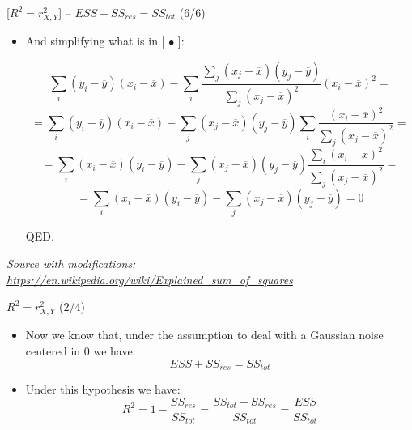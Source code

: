 \documentclass{beamer}
\begin{document}
\begin{frame}
{\centerline{ [$R^2 = r_{X,Y}^2$] -- $ESS + SS_{res} = SS_{tot} $ (6/6)}}

\begin{itemize}
\item And simplifying what is in [ $\bullet$ ]:

$$ \sum_i (y_{i}-{\overline {y}}) (x_i - \overline{x}) -
\sum_i{{\frac {\sum _{j}(x_{j}-{\overline {x}})(y_{j}-{\overline {y}})}{\sum _{j}(x_{j}-{\overline {x}})^{2}}}
}(x_{i}-{\overline {x}})^2 = $$
$$=  \sum_i (y_{i}-{\overline {y}}) (x_i - \overline{x}) -
\sum _{j}(x_{j}-{\overline {x}})(y_{j}-{\overline {y}})\sum_i{{\frac {(x_{i}-{\overline {x}})^2}{\sum _{j}(x_{j}-{\overline {x}})^{2}}}
}= $$
$$=  \sum_i (x_i - \overline{x}) (y_{i}-{\overline {y}})  -
\sum _{j}(x_{j}-{\overline {x}})(y_{j}-{\overline {y}}){\frac {\sum_i{(x_{i}-{\overline {x}})^2}}{\sum _{j}(x_{j}-{\overline {x}})^{2}}} = $$
$$=  \sum_i (x_i - \overline{x}) (y_{i}-{\overline {y}})  -
\sum _{j}(x_{j}-{\overline {x}})(y_{j}-{\overline {y}}) = 0 $$


QED.


\end{itemize}

\textit{\small
Source with modifications: \url{https://en.wikipedia.org/wiki/Explained_sum_of_squares}}
\end{frame}


\begin{frame}
{\centerline{$R^2 = r_{X,Y}^2$ (2/4)}}
\begin{itemize}
\item Now we know that, under the assumption to deal with a Gaussian noise centered in 0 we have:
$$ESS + SS_{res} = SS_{tot} $$
\item Under this hypothesis we have:
$$R^2 = 1 - \frac{SS_{res}}{SS_{tot}} = \frac{SS_{tot}-SS_{res}}{SS_{tot}} = \frac{ESS}{SS_{tot}} $$
\end{itemize}
\end{frame}
\end{document}
